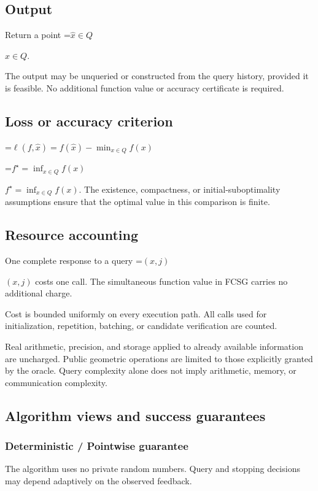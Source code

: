 \documentclass[10pt,a4paper]{article}
\newcommand{\AtlasMath}[1]{\par\begingroup\centering\setbox0=\hbox{$\displaystyle #1$}\ifdim\wd0>1.4\linewidth\typeout{ATLAS WIDE FORMULA: \the\wd0}\fi\ifdim\wd0>\linewidth\resizebox{\linewidth}{!}{\box0}\else\box0\fi\par\endgroup}
\newcommand{\AtlasInlineMath}[1]{\begingroup\setbox0=\hbox{$#1$}\ifdim\wd0>.4\linewidth\endgroup\AtlasMath{#1}\else\endgroup$#1$\fi}
\begin{document}
\subsection{Output}
Return a point \AtlasInlineMath{\widehat x\in Q}.

The output may be unqueried or constructed from the query history, provided it is feasible. No additional function value or accuracy certificate is required.

\subsection{Loss or accuracy criterion}

\AtlasMath{\ell(f,\widehat{x})=f(\widehat{x})-\min_{x\in Q}f(x)}


\AtlasInlineMath{f^\star=\inf_{x\in Q}f(x)}. The existence, compactness, or initial-suboptimality assumptions ensure that the optimal value in this comparison is finite.

\subsection{Resource accounting}
One complete response to a query \AtlasInlineMath{(x,j)} costs one call. The simultaneous function value in FCSG carries no additional charge.

Cost is bounded uniformly on every execution path. All calls used for initialization, repetition, batching, or candidate verification are counted.

Real arithmetic, precision, and storage applied to already available information are uncharged. Public geometric operations are limited to those explicitly granted by the oracle. Query complexity alone does not imply arithmetic, memory, or communication complexity.

\subsection{Algorithm views and success guarantees}
\subsubsection{Deterministic / Pointwise guarantee}
The algorithm uses no private random numbers. Query and stopping decisions may depend adaptively on the observed feedback.
\end{document}

